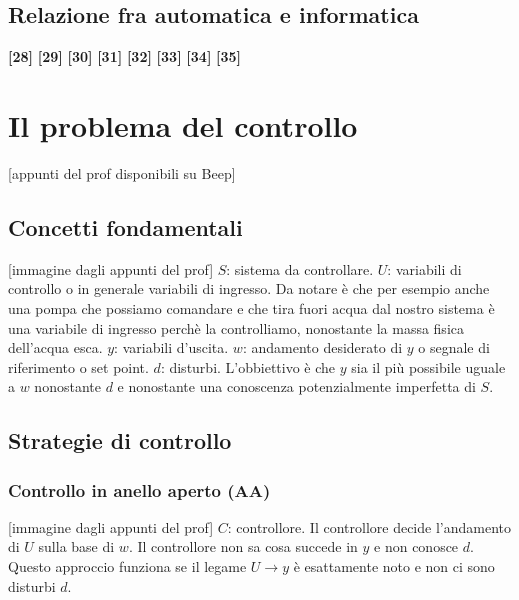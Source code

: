 \subsection{Relazione fra automatica e informatica}
\textbf{[28]}\;
\newline\textbf{[29]}\;
\newline\textbf{[30]}\;
\newline\textbf{[31]}\;
\newline\textbf{[32]}\;
\newline\textbf{[33]}\;
\newline\textbf{[34]}\;
\newline\textbf{[35]}
\section{Il problema del controllo}
[appunti del prof disponibili su Beep]
\subsection{Concetti fondamentali}
[immagine dagli appunti del prof]\newline
$S$: sistema da controllare. \newline
$U$: variabili di controllo o in generale variabili di ingresso. Da notare è che per esempio anche una pompa che possiamo comandare e che tira fuori acqua dal nostro sistema è una variabile di ingresso perchè la controlliamo, nonostante la massa fisica dell'acqua esca.
$y$: variabili d'uscita.\newline
$w$: andamento desiderato di $y$ o segnale di riferimento o set point.\newline
$d$: disturbi.\newline
L'obbiettivo è che $y$ sia il più possibile uguale a $w$ nonostante $d$ e nonostante una conoscenza potenzialmente imperfetta di $S$.
\subsection{Strategie di controllo}
\subsubsection{Controllo in anello aperto (AA)}
[immagine dagli appunti del prof]\newline
$C$: controllore.\newline
Il controllore decide l'andamento di $U$ sulla base di $w$. Il controllore non sa cosa succede in $y$ e non conosce $d$.\newline
Questo approccio funziona se il legame $U \rightarrow y$ è esattamente noto e non ci sono disturbi $d$.\newline
